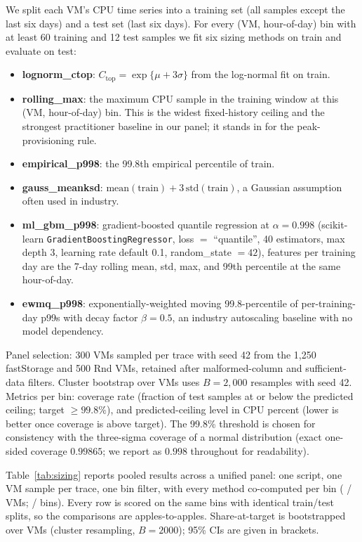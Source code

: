 \documentclass[11pt,a4paper]{article}
\newcommand{\Ctop}{C_{\text{top}}}
\begin{document}
We split each VM's CPU time series into a training set (all samples except
the last six days) and a test set (last six days). For every
(VM, hour-of-day) bin with at least 60 training and 12 test samples we fit
six sizing methods on train and evaluate on test:
\begin{itemize}
  \item \textbf{lognorm\_ctop}: $\Ctop = \exp\{\mu + 3\sigma\}$ from the
        log-normal fit on train.
  \item \textbf{rolling\_max}: the maximum CPU sample in the training window
        at this (VM, hour-of-day) bin. This is the widest fixed-history
        ceiling and the strongest practitioner baseline in our panel; it
        stands in for the peak-provisioning rule.
  \item \textbf{empirical\_p998}: the 99.8th empirical percentile of train.
  \item \textbf{gauss\_meanksd}: $\text{mean}(\text{train}) + 3\,\text{std}(\text{train})$, a Gaussian assumption often used in industry.
  \item \textbf{ml\_gbm\_p998}: gradient-boosted quantile regression at
        $\alpha = 0.998$ (scikit-learn \texttt{GradientBoostingRegressor},
        loss $=$ ``quantile'', 40 estimators, max depth 3, learning rate
        default 0.1, random\_state $=42$), features per training day are the
        7-day rolling mean, std, max, and 99th percentile at the same
        hour-of-day.
  \item \textbf{ewmq\_p998}: exponentially-weighted moving 99.8-percentile of
        per-training-day p99s with decay factor $\beta = 0.5$, an industry
        autoscaling baseline with no model dependency.
\end{itemize}
Panel selection: 300 VMs sampled per trace with seed 42 from the 1,250
fastStorage and 500 Rnd VMs, retained after malformed-column and
sufficient-data filters. Cluster bootstrap over VMs uses $B = 2{,}000$
resamples with seed 42. Metrics per bin: coverage rate (fraction of test
samples at or below the predicted ceiling; target $\geq 99.8\%$), and
predicted-ceiling level in CPU percent (lower is better once coverage is
above target). The 99.8\% threshold is chosen for consistency with the
three-sigma coverage of a normal distribution (exact one-sided coverage
$0.99865$; we report as $0.998$ throughout for readability).

Table~\ref{tab:sizing} reports pooled results across a unified panel:
one script, one VM sample per trace, one bin filter, with every method
co-computed per bin (\PanelFsNVms{} / \PanelRnNVms{} VMs;
\PanelFsNBins{} / \PanelRnNBins{} bins). Every row is scored on the same
bins with identical train/test splits, so the comparisons are
apples-to-apples. Share-at-target is bootstrapped over VMs
(cluster resampling, $B=2000$); 95\% CIs are given in brackets.
\end{document}
